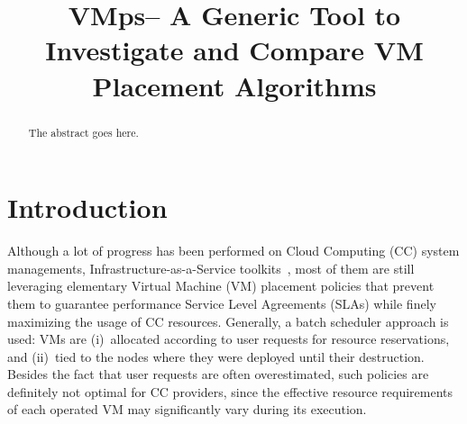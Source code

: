 \documentclass[conference]{IEEEtran}
\newcommand{\vmps}{VMps\xspace}
\begin{document}
%
\title{\vmps -- A Generic Tool to Investigate and Compare VM Placement Algorithms}


\author{
}



\maketitle

\thispagestyle{plain}
\pagestyle{plain}

\begin{abstract}
The abstract goes here.
\end{abstract}





%
\IEEEpeerreviewmaketitle



\section{Introduction}
\label{sec:intro}

Although a lot of progress has been performed on Cloud Computing (CC)
system managements, \aka Infrastructure-as-a-Service
toolkits~\cite{moreno:2012}, most of them
are still leveraging
elementary Virtual Machine (VM) placement policies that prevent them
to guarantee performance Service Level Agreements (SLAs) while
finely maximizing the usage of CC resources.
Generally, a batch scheduler
approach is used: VMs are
(i)~allocated according to user requests for resource reservations,
and (ii)~tied to the nodes where they were deployed until their
destruction. Besides the fact that user requests are often
overestimated, such policies are definitely not optimal for
CC providers, since the effective
resource requirements of each operated VM may significantly vary
during its execution.
\end{document}
